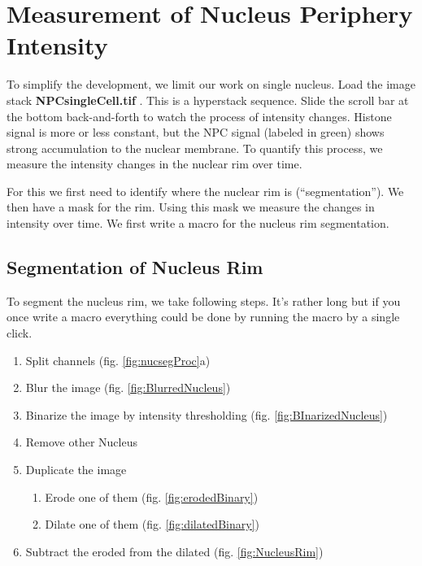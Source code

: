 \section{Measurement of Nucleus Periphery Intensity}

To simplify the development, we limit our work on single nucleus. Load the image stack \textbf{NPCsingleCell.tif} . This is a hyperstack sequence. Slide the scroll bar at the bottom back-and-forth to watch the process of intensity changes. Histone signal is more or less constant, but the NPC signal (labeled in green) shows strong accumulation to the nuclear membrane. To quantify this process, we measure the intensity changes in the nuclear rim over time.

For this we first need to identify where the nuclear rim is (``segmentation''). We then have a mask for the rim. Using this mask we measure the changes in intensity over time. We first write a macro for the nucleus rim segmentation.

\subsection{Segmentation of Nucleus Rim}

To segment the nucleus rim, we take following steps. It's rather long but if you once write a macro everything could be done by running the macro by a single click.

\begin{enumerate}
    \item Split channels (fig. \ref{fig:nucsegProc}a)
    \item Blur the image (fig. \ref{fig:BlurredNucleus})
    \item Binarize the image by intensity thresholding (fig. \ref{fig:BInarizedNucleus})
    \item Remove other Nucleus
    \item Duplicate the image

    \begin{enumerate}
        \item Erode one of them (fig. \ref{fig:erodedBinary})
        \item Dilate one of them (fig. \ref{fig:dilatedBinary})

    \end{enumerate}
    \item Subtract the eroded from the dilated (fig. \ref{fig:NucleusRim})

\end{enumerate}